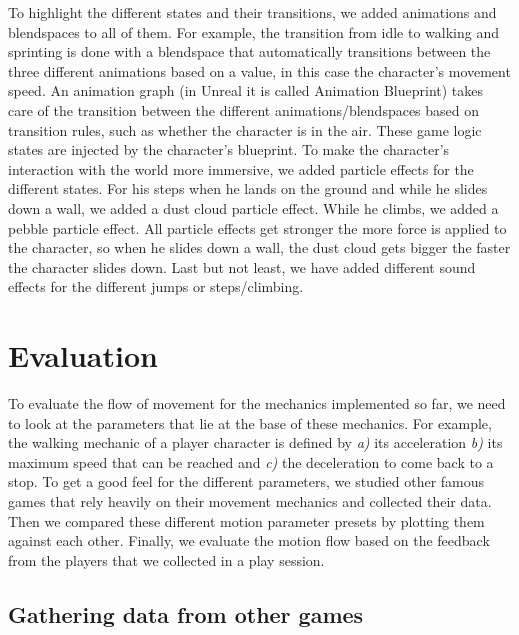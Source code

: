 \documentclass[letterpaper, 10 pt, conference]{ieeeconf}  %
\begin{document}
To highlight the different states and their transitions, we added animations and blendspaces to all of them.
For example, the transition from idle to walking and sprinting is done with a blendspace that automatically transitions between the three different animations based on a value, in this case the character's movement speed.
An animation graph (in Unreal it is called Animation Blueprint) takes care of the transition between the different animations/blendspaces based on transition rules, such as whether the character is in the air.
These game logic states are injected by the character's blueprint.
To make the character's interaction with the world more immersive, we added particle effects for the different states.
For his steps when he lands on the ground and while he slides down a wall, we added a dust cloud particle effect.
While he climbs, we added a pebble particle effect.
All particle effects get stronger the more force is applied to the character, so when he slides down a wall, the dust cloud gets bigger the faster the character slides down.
Last but not least, we have added different sound effects for the different jumps or steps/climbing.


\section{Evaluation}
\label{Sec:Evaluation}

To evaluate the flow of movement for the mechanics implemented so far, we need to look at the parameters that lie at the base of these mechanics.
For example, the walking mechanic of a player character is defined by \textit{a)} its acceleration \textit{b)} its maximum speed that can be reached and \textit{c)} the deceleration to come back to a stop.
To get a good feel for the different parameters, we studied other famous games that rely heavily on their movement mechanics and collected their data.
Then we compared these different motion parameter presets by plotting them against each other.
Finally, we evaluate the motion flow based on the feedback from the players that we collected in a play session.

\subsection{Gathering data from other games}
\end{document}
